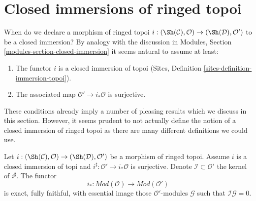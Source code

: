 \section{Closed immersions of ringed topoi}
\label{section-closed-immersion}

\noindent
When do we declare a morphism of ringed topoi
$i : (\Sh(\mathcal{C}), \mathcal{O}) \to (\Sh(\mathcal{D}), \mathcal{O}')$
to be a closed immersion? By analogy with the discussion in
Modules, Section \ref{modules-section-closed-immersion}
it seems natural to assume at least:
\begin{enumerate}
\item The functor $i$ is a closed immersion of topoi
(Sites, Definition \ref{sites-definition-immersion-topoi}).
\item The associated map $\mathcal{O}' \to i_*\mathcal{O}$ is surjective.
\end{enumerate}
These conditions already imply a number of pleasing results which we discuss
in this section. However, it seems prudent to not actually define the
notion of a closed immersion of ringed topoi as there are many different
definitions we could use.

\begin{lemma}
\label{lemma-i-star-equivalence}
Let $i : (\Sh(\mathcal{C}), \mathcal{O}) \to (\Sh(\mathcal{D}), \mathcal{O}')$
be a morphism of ringed topoi. Assume $i$ is a closed immersion of topi
and $i^\sharp : \mathcal{O}' \to i_*\mathcal{O}$ is surjective.
Denote $\mathcal{I} \subset \mathcal{O}'$ the kernel of $i^\sharp$.
The functor
$$
i_* :
\textit{Mod}(\mathcal{O})
\longrightarrow
\textit{Mod}(\mathcal{O}')
$$
is exact, fully faithful, with essential image those
$\mathcal{O}'$-modules $\mathcal{G}$ such that $\mathcal{I}\mathcal{G} = 0$.
\end{lemma}


